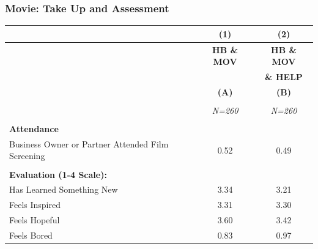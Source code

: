 \documentclass[hideothersubsections, usenames,dvipsnames,10pt]{beamer}
\begin{document}
\begin{frame}
\frametitle{Movie: Take Up and Assessment}
{\scriptsize{\begin{table}[htbp]
  \centering
    \begin{tabular}{lcc}
    \hline
   	& (1)   					&(2)   						 \\
    \hline
  	& \textbf{HB \& MOV} 		& \textbf{HB \& MOV}		  \\
  	& 							& \textbf{\& HELP}			\\
   	& \textbf{(A)}   			& \textbf{(B)}   			 \\
 	&							&							\\
   	& \textit{N=260} 			& \textit{N=260} 			 \\
   \hline
   														&		&		 \\
    \textbf{Attendance} 								&       &         \\
    Business Owner or Partner Attended Film Screening 	& 0.52  & 0.49   \\
	&       &       \\
    \textbf{Evaluation (1-4 Scale):}	&       &        \\
    Has Learned Something New	& 3.34  & 3.21  \\
    Feels Inspired 				& 3.31  & 3.30   \\
    Feels Hopeful 				& 3.60  & 3.42   \\
    Feels Bored 				& 0.83  & 0.97    \\
    \end{tabular}

\end{table}}}

\end{frame}
\end{document}
